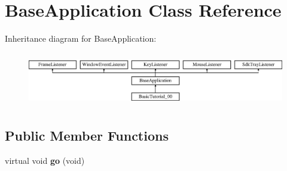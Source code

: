 \hypertarget{class_base_application}{}\section{Base\+Application Class Reference}
\label{class_base_application}
Inheritance diagram for Base\+Application\+:\begin{figure}[H]
\begin{center}
\leavevmode
\includegraphics[height=2.382979cm]{class_base_application}
\end{center}
\end{figure}
\subsection*{Public Member Functions}
\begin{DoxyCompactItemize}
\item 
virtual void {\bfseries go} (void)\hypertarget{class_base_application_a8a14a65a29118dd75173aa68678a05e1}{}\label{class_base_application_a8a14a65a29118dd75173aa68678a05e1}

\end{DoxyCompactItemize}
